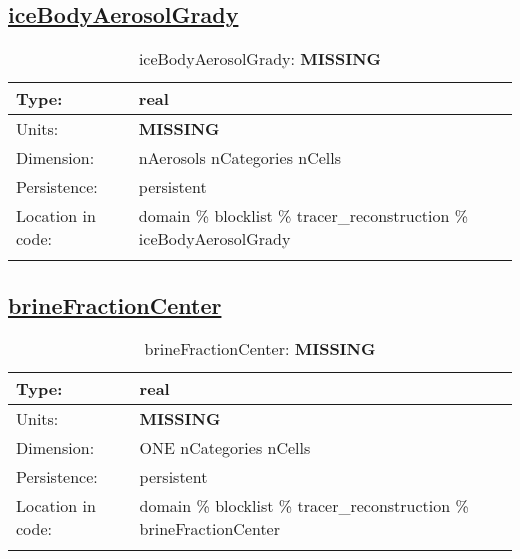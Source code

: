 \subsection[iceBodyAerosolGrady]{\hyperref[sec:var_tab_tracer_reconstruction]{iceBodyAerosolGrady}}
\label{subsec:var_sec_tracer_reconstruction_iceBodyAerosolGrady}
\begin{center}
\begin{longtable}{| p{2.0in} | p{4.0in} |}
        \hline 
        Type: & real \\
        \hline 
        Units: & {\bf \color{red} MISSING} \\
        \hline 
        Dimension: & nAerosols nCategories nCells \\
        \hline 
        Persistence: & persistent \\
        \hline 
         Location in code: & domain \% blocklist \% tracer\_reconstruction \% iceBodyAerosolGrady \\
         \hline 
    \caption{iceBodyAerosolGrady: {\bf \color{red} MISSING}}
\end{longtable}
\end{center}
\subsection[brineFractionCenter]{\hyperref[sec:var_tab_tracer_reconstruction]{brineFractionCenter}}
\label{subsec:var_sec_tracer_reconstruction_brineFractionCenter}
\begin{center}
\begin{longtable}{| p{2.0in} | p{4.0in} |}
        \hline 
        Type: & real \\
        \hline 
        Units: & {\bf \color{red} MISSING} \\
        \hline 
        Dimension: & ONE nCategories nCells \\
        \hline 
        Persistence: & persistent \\
        \hline 
         Location in code: & domain \% blocklist \% tracer\_reconstruction \% brineFractionCenter \\
         \hline 
    \caption{brineFractionCenter: {\bf \color{red} MISSING}}
\end{longtable}
\end{center}
